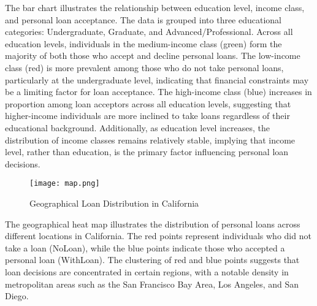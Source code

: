 \documentclass{article}
\begin{document}
The bar chart illustrates the relationship between education level, income class, and personal loan acceptance. The data is grouped into three educational categories: Undergraduate, Graduate, and Advanced/Professional. Across all education levels, individuals in the medium-income class (green) form the majority of both those who accept and decline personal loans. The low-income class (red) is more prevalent among those who do not take personal loans, particularly at the undergraduate level, indicating that financial constraints may be a limiting factor for loan acceptance. The high-income class (blue) increases in proportion among loan acceptors across all education levels, suggesting that higher-income individuals are more inclined to take loans regardless of their educational background. Additionally, as education level increases, the distribution of income classes remains relatively stable, implying that income level, rather than education, is the primary factor influencing personal loan decisions.

\begin{figure}[h]
    \centering
    \texttt{[image: map.png]}
    \caption{Geographical Loan Distribution in California}
    \label{fig:enter-label}
\end{figure}
The geographical heat map illustrates the distribution of personal loans across different locations in California. The red points represent individuals who did not take a loan (NoLoan), while the blue points indicate those who accepted a personal loan (WithLoan). The clustering of red and blue points suggests that loan decisions are concentrated in certain regions, with a notable density in metropolitan areas such as the San Francisco Bay Area, Los Angeles, and San Diego. 
\end{document}
